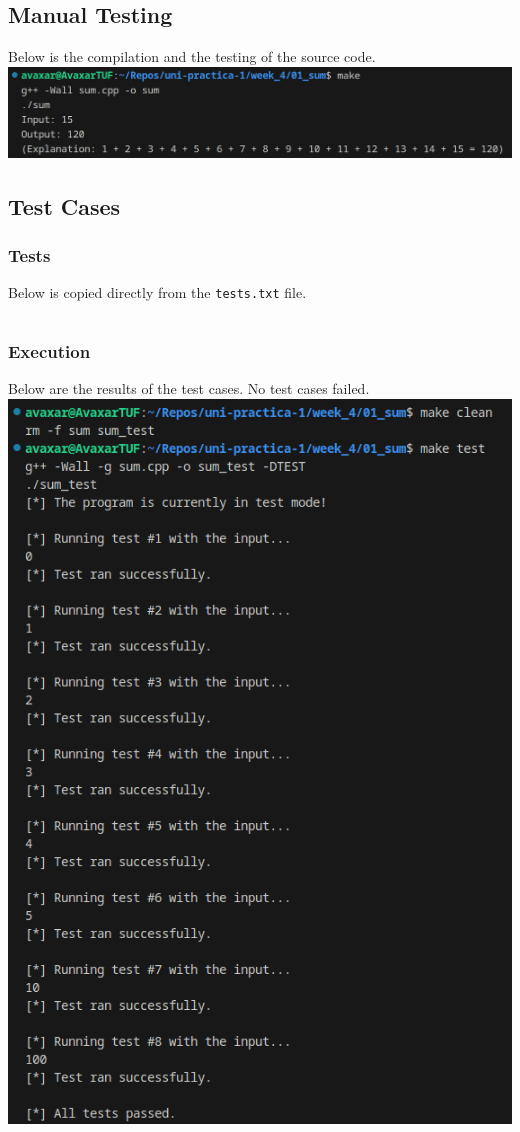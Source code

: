 \documentclass[12pt]{article}
\begin{document}
\subsection{Manual Testing}
Below is the compilation and the testing of the source code.
\newline\includegraphics[width=\textwidth]{01_sum}

\subsection{Test Cases}

\subsubsection{Tests}
Below is copied directly from the \texttt{tests.txt} file.
\inputminted{text}{01_sum/tests.txt}

\subsubsection{Execution}
Below are the results of the test cases. No test cases failed.
\newline\includegraphics[width=\textwidth]{01_sum_test}
\end{document}
